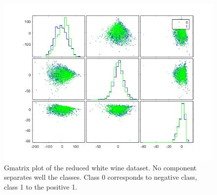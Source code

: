 \documentclass[a4paper, 10pt]{article}
\begin{document}
  \begin{figure}[htpb]
    \centering
    \includegraphics[width=0.7\linewidth]{./project/wine_gplot.png}
    \caption{Gmatrix plot of the reduced white wine dataset. No component
    separates well the classes. Class 0 corresponds to negative class,
  class 1 to the positive 1.}
    \label{fig:l5_wine_gmatrix}
  \end{figure}
    
\end{document}
